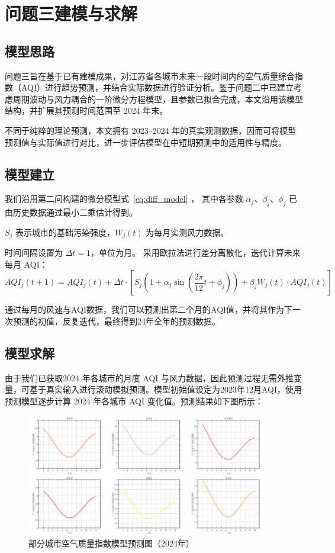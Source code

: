 \documentclass[a4paper,12pt]{article}
\begin{document}
		
	\section{问题三建模与求解}
	
	\subsection{模型思路}
	
	问题三旨在基于已有建模成果，对江苏省各城市未来一段时间内的空气质量综合指数（AQI）进行趋势预测，并结合实际数据进行验证分析。鉴于问题二中已建立考虑周期波动与风力耦合的一阶微分方程模型，且参数已拟合完成，本文沿用该模型结构，并扩展其预测时间范围至 2024 年末。
	
	不同于纯粹的理论预测，本文拥有 2023–2024 年的真实观测数据，因而可将模型预测值与实际值进行对比，进一步评估模型在中短期预测中的适用性与精度。
	
	\subsection{模型建立}
	
	我们沿用第二问构建的微分模型式~\eqref{eq:diff_model} ，
	其中各参数 $\alpha_j$、$\beta_j$、$\phi_j$ 已由历史数据通过最小二乘估计得到。
	
	$S_j$ 表示城市的基础污染强度，$W_j(t)$ 为每月实测风力数据。
	
	时间间隔设置为 $\Delta t = 1$，单位为月。
	采用欧拉法进行差分离散化，迭代计算未来每月 AQI：
	\begin{equation}
	AQI_j(t + 1) = AQI_j(t) + \Delta t \cdot \left[ S_j \left(1 + \alpha_j \sin\left(\frac{2\pi}{12}t + \phi_j \right) \right) + \beta_j W_j(t) \cdot AQI_j(t) \right]
	\end{equation}
	
	通过每月的风速与AQI数据，我们可以预测出第二个月的AQI值，并将其作为下一次预测的初值，反复迭代，最终得到24年全年的预测数据。
	
	\subsection{模型求解}
	
	由于我们已获取2024 年各城市的月度 AQI 与风力数据，因此预测过程无需外推变量，可基于真实输入进行滚动模拟预测。模型初始值设定为2023年12月AQI，使用预测模型逐步计算 2024 年各城市 AQI 变化值。预测结果如下图所示：
		\begin{figure}[htbp]
		\centering
		\includegraphics[width=0.95\textwidth]{预测图拼接_6市.png}
		\caption{部分城市空气质量指数模型预测图（2024年）}
	\end{figure}
	
\end{document}
